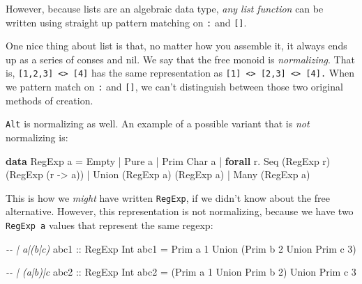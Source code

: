 \documentclass[]{article}
\newenvironment{Shaded}{}{}
\newcommand{\CharTok}[1]{\textcolor[rgb]{0.25,0.44,0.63}{#1}}
\newcommand{\CommentTok}[1]{\textcolor[rgb]{0.38,0.63,0.69}{\textit{#1}}}
\newcommand{\DataTypeTok}[1]{\textcolor[rgb]{0.56,0.13,0.00}{#1}}
\newcommand{\DecValTok}[1]{\textcolor[rgb]{0.25,0.63,0.44}{#1}}
\newcommand{\KeywordTok}[1]{\textcolor[rgb]{0.00,0.44,0.13}{\textbf{#1}}}
\newcommand{\NormalTok}[1]{#1}
\newcommand{\OperatorTok}[1]{\textcolor[rgb]{0.40,0.40,0.40}{#1}}
\newcommand{\OtherTok}[1]{\textcolor[rgb]{0.00,0.44,0.13}{#1}}
\begin{document}
However, because lists are an algebraic data type, \emph{any list function} can
be written using straight up pattern matching on \texttt{:} and \texttt{{[}{]}}.

One nice thing about list is that, no matter how you assemble it, it always ends
up as a series of conses and nil. We say that the free monoid is
\emph{normalizing}. That is,
\texttt{{[}1,2,3{]}\ \textless{}\textgreater{}\ {[}4{]}} has the same
representation as
\texttt{{[}1{]}\ \textless{}\textgreater{}\ {[}2,3{]}\ \textless{}\textgreater{}\ {[}4{]}.}
When we pattern match on \texttt{:} and \texttt{{[}{]}}, we can't distinguish
between those two original methods of creation.

\texttt{Alt} is normalizing as well. An example of a possible variant that is
\emph{not} normalizing is:

\begin{Shaded}
\begin{Highlighting}[]
\KeywordTok{data} \DataTypeTok{RegExp}\NormalTok{ a }\OtherTok{=} \DataTypeTok{Empty}
              \OperatorTok{|} \DataTypeTok{Pure}\NormalTok{ a}
              \OperatorTok{|} \DataTypeTok{Prim} \DataTypeTok{Char}\NormalTok{ a}
              \OperatorTok{|} \KeywordTok{forall}\NormalTok{ r}\OperatorTok{.} \DataTypeTok{Seq}\NormalTok{ (}\DataTypeTok{RegExp}\NormalTok{ r) (}\DataTypeTok{RegExp}\NormalTok{ (r }\OtherTok{{-}\textgreater{}}\NormalTok{ a))}
              \OperatorTok{|} \DataTypeTok{Union}\NormalTok{ (}\DataTypeTok{RegExp}\NormalTok{ a) (}\DataTypeTok{RegExp}\NormalTok{ a)}
              \OperatorTok{|} \DataTypeTok{Many}\NormalTok{ (}\DataTypeTok{RegExp}\NormalTok{ a)}
\end{Highlighting}
\end{Shaded}

This is how we \emph{might} have written \texttt{RegExp}, if we didn't know
about the free alternative. However, this representation is not normalizing,
because we have two \texttt{RegExp\ a} values that represent the same regexp:

\begin{Shaded}
\begin{Highlighting}[]
\CommentTok{{-}{-} | a|(b|c)}
\OtherTok{abc1 ::} \DataTypeTok{RegExp} \DataTypeTok{Int}
\NormalTok{abc1 }\OtherTok{=} \DataTypeTok{Prim} \CharTok{\textquotesingle{}a\textquotesingle{}} \DecValTok{1} \OtherTok{\textasciigrave{}Union\textasciigrave{}}\NormalTok{ (}\DataTypeTok{Prim} \CharTok{\textquotesingle{}b\textquotesingle{}} \DecValTok{2} \OtherTok{\textasciigrave{}Union\textasciigrave{}} \DataTypeTok{Prim} \CharTok{\textquotesingle{}c\textquotesingle{}} \DecValTok{3}\NormalTok{)}

\CommentTok{{-}{-} | (a|b)|c}
\OtherTok{abc2 ::} \DataTypeTok{RegExp} \DataTypeTok{Int}
\NormalTok{abc2 }\OtherTok{=}\NormalTok{ (}\DataTypeTok{Prim} \CharTok{\textquotesingle{}a\textquotesingle{}} \DecValTok{1} \OtherTok{\textasciigrave{}Union\textasciigrave{}} \DataTypeTok{Prim} \CharTok{\textquotesingle{}b\textquotesingle{}} \DecValTok{2}\NormalTok{) }\OtherTok{\textasciigrave{}Union\textasciigrave{}} \DataTypeTok{Prim} \CharTok{\textquotesingle{}c\textquotesingle{}} \DecValTok{3}
\end{Highlighting}
\end{Shaded}
\end{document}
